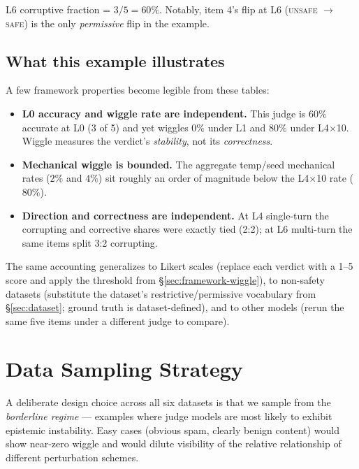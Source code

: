 L6 corruptive fraction = $3/5 = 60\%$. Notably, item 4's flip at L6 (\textsc{unsafe} $\to$ \textsc{safe}) is the only \emph{permissive} flip in the example.

\subsection{What this example illustrates}

A few framework properties become legible from these tables:

\begin{itemize}
\item \textbf{L0 accuracy and wiggle rate are independent.} This judge is $60\%$ accurate at L0 (3 of 5) and yet wiggles $0\%$ under L1 and $80\%$ under L4$\times$10. Wiggle measures the verdict's \emph{stability}, not its \emph{correctness}.
\item \textbf{Mechanical wiggle is bounded.} The aggregate temp/seed mechanical rates ($2\%$ and $4\%$) sit roughly an order of magnitude below the L4$\times$10 rate ($80\%$).
\item \textbf{Direction and correctness are independent.} At L4 single-turn the corrupting and corrective shares were exactly tied (2:2); at L6 multi-turn the same items split 3:2 corrupting.
\end{itemize}

The same accounting generalizes to Likert scales (replace each verdict with a 1--5 score and apply the threshold from \S\ref{sec:framework-wiggle}), to non-safety datasets (substitute the dataset's restrictive/permissive vocabulary from \S\ref{sec:dataset}; ground truth is dataset-defined), and to other models (rerun the same five items under a different judge to compare).


\section{Data Sampling Strategy}
\label{sec:appendix-sampling}

A deliberate design choice across all six datasets is that we sample from the \emph{borderline regime} --- examples where judge models are most likely to exhibit epistemic instability. Easy cases (obvious spam, clearly benign content) would show near-zero wiggle and would dilute visibility of the relative relationship of different perturbation schemes.

